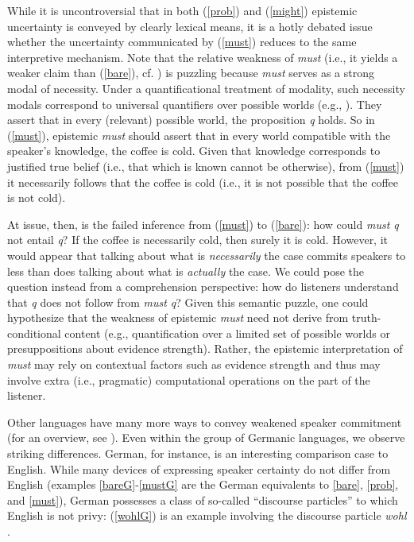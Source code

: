 \documentclass[11pt]{article}
\begin{document}
While it is uncontroversial that in both (\ref{prob}) and (\ref{might}) epistemic uncertainty is conveyed by clearly lexical means, it is a hotly debated issue whether the uncertainty communicated by (\ref{must}) reduces to the same interpretive mechanism. Note that the relative weakness of \emph{must} (i.e., it yields a weaker claim than (\ref{bare}), cf. \citealp{karttunen1972}) is puzzling because \emph{must} serves as a strong modal of necessity. Under a quantificational treatment of modality, such necessity modals correspond to universal quantifiers over possible worlds (e.g., \citealp{kratzer1991}). They assert that in every (relevant) possible world, the proposition \emph{q} holds. So in (\ref{must}), epistemic \emph{must} should assert that in every world compatible with the speaker's knowledge, the coffee is cold. Given that knowledge corresponds to justified true belief (i.e., that which is known cannot be otherwise), from (\ref{must}) it necessarily follows that the coffee is cold (i.e., it is not possible that the coffee is not cold).

At issue, then, is the failed inference from (\ref{must}) to (\ref{bare}): how could \emph{must q} not entail \emph{q}? If the coffee is necessarily cold, then surely it is cold. However, it would appear that talking about what is \emph{necessarily} the case commits speakers to less than does talking about what is \emph{actually} the case. We could pose the question instead from a comprehension perspective: how do listeners understand that \emph{q} does not follow from \emph{must q}? Given this semantic puzzle, one could hypothesize that the weakness of epistemic \emph{must} need not derive from truth-conditional content (e.g., quantification over a limited set of possible worlds or presuppositions about evidence strength). Rather, the epistemic interpretation of \emph{must} may rely on contextual factors such as evidence strength and thus may involve extra (i.e., pragmatic) computational operations on the part of the listener.

Other languages have many more ways to convey weakened speaker commitment (for an overview, see \citealp{Aikhenvald2004,Drubig2001,Nuyts2001}). Even within the group of Germanic languages, we observe striking differences. German, for instance, is an interesting comparison case to English. While many devices of expressing speaker certainty do not differ from English (examples \ref{bareG}-\ref{mustG} are the German equivalents to \ref{bare}, \ref{prob}, and \ref{must}), German possesses a class of so-called ``discourse particles'' to which English is not privy: (\ref{wohlG}) is an example involving the discourse particle \emph{wohl} \citep{Zimmermann2004}. 
\end{document}
